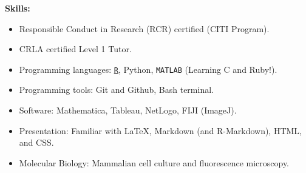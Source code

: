 \textbf{Skills:}

\begin{itemize}[noitemsep]
\item Responsible Conduct in Research (RCR) certified (CITI Program).
\item CRLA certified Level 1 Tutor.
\item Programming languages: \ul{\texttt{R}}, Python, \texttt{MATLAB} (Learning C and Ruby!).
\item Programming tools: Git and Github, Bash terminal.
\item Software: Mathematica, Tableau, NetLogo, FIJI (ImageJ).
\item Presentation: Familiar with \LaTeX{}, Markdown (and R-Markdown), HTML, and CSS.
\item Molecular Biology: Mammalian cell culture and fluorescence microscopy.
\end{itemize}